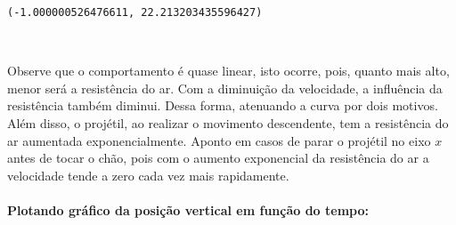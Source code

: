\documentclass[12pt]{article}
\makeatletter
\newcommand{\boxspacing}{\kern\kvtcb@left@rule\kern\kvtcb@boxsep}
\newcommand{\prompt}[4]{
        {\ttfamily\llap{{\color{#2}[#3]:\hspace{3pt}#4}}\vspace{-\baselineskip}}
    }
\makeatother
\begin{document}
            \begin{tcolorbox}[breakable, size=fbox, boxrule=.5pt, pad at break*=1mm, opacityfill=0]
\prompt{Out}{outcolor}{21}{\boxspacing}
\begin{Verbatim}[commandchars=\\\{\}]
(-1.000000526476611, 22.213203435596427)
\end{Verbatim}
\end{tcolorbox}
        
    \begin{center}
    \end{center}
    { \hspace*{\fill} \\}
    
    Observe que o comportamento é quase linear, isto ocorre, pois, quanto
mais alto, menor será a resistência do ar. Com a diminuição da
velocidade, a influência da resistência também diminui. Dessa forma,
atenuando a curva por dois motivos. Além disso, o projétil, ao realizar
o movimento descendente, tem a resistência do ar aumentada
exponencialmente. Aponto em casos de parar o projétil no eixo \(x\)
antes de tocar o chão, pois com o aumento exponencial da resistência do
ar a velocidade tende a zero cada vez mais rapidamente.

\hypertarget{plotando-gruxe1fico-da-posiuxe7uxe3o-vertical-em-funuxe7uxe3o-do-tempo}{%
\paragraph{Plotando gráfico da posição vertical em função do
tempo:}\label{plotando-gruxe1fico-da-posiuxe7uxe3o-vertical-em-funuxe7uxe3o-do-tempo}}
\end{document}
